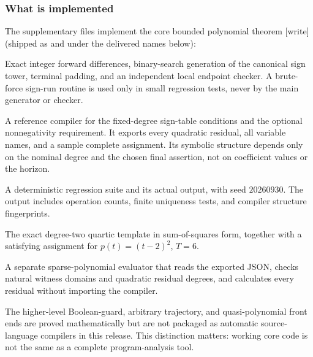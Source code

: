 \documentclass[11pt,a4paper]{article}
\theoremstyle{definition}
\theoremstyle{remark}
\newcommand{\code}[1]{\texttt{\detokenize{#1}}}
\newcommand{\wtag}{\textup{[write]}}%
\begin{document}
\subsubsection{What is implemented}
The supplementary files implement the core bounded polynomial theorem \wtag{} (shipped as  and  under the delivered names below):
\begin{description}[style=nextline]
\item[\code{certificates.py}]
Exact integer forward differences, binary-search generation of the
canonical sign tower, terminal padding, and an independent local
endpoint checker. A brute-force sign-run routine is used only in small
regression tests, never by the main generator or checker.
\item[\code{quartic_compiler.py}]
A reference compiler for the fixed-degree sign-table conditions and the
optional nonnegativity requirement. It exports every quadratic residual,
all variable names, and a sample complete assignment. Its symbolic
structure depends only on the nominal degree and the chosen final
assertion, not on coefficient values or the horizon.
\item[\code{run_tests.py} and \code{test_report.json}]
A deterministic regression suite and its actual output, with seed
$20260930$. The output includes operation counts, finite uniqueness tests,
and compiler structure fingerprints.
\item[\code{quartic_example.json}]
The exact degree-two quartic template in sum-of-squares form, together with
a satisfying assignment for $p(t)=(t-2)^2$, $T=6$.
\item[\code{verify_export.py}]
A separate sparse-polynomial evaluator that reads the exported JSON,
checks natural witness domains and quadratic residual degrees, and
calculates every residual without importing the compiler.
\end{description}
The higher-level Boolean-guard, arbitrary trajectory, and quasi-polynomial
front ends are proved mathematically but are not packaged as automatic
source-language compilers in this release. This distinction matters:
working core code is not the same as a complete program-analysis tool.
\end{document}
